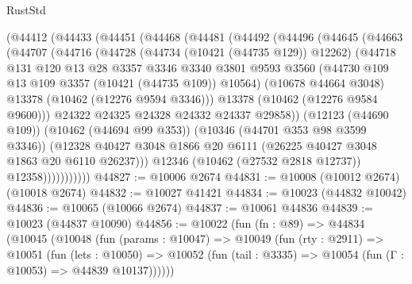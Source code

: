 \begin{lexlean}{RustStd}
\begin{coremodule}
          (@44412
            (@44433
              (@44451
                (@44468
                  (@44481
                    (@44492
                      (@44496
                        (@44645
                          (@44663
                            (@44707
                              (@44716
                                (@44728
                                  (@44734 (@10421 (@44735 @129)) @12262)
                                  (@44718
                                    @131
                                    @120
                                    @13
                                    @28
                                    @3357
                                    @3346
                                    @3340
                                    @3801
                                    @9593
                                    @3560
                                    (@44730 @109 @13 @109 @3357 (@10421 (@44735 @109)) @10564)
                                    (@10678 @44664 @3048)
                                    @13378
                                    (@10462 (@12276 @9594 @3346)))
                                  @13378
                                  (@10462 (@12276 @9584 @9600)))
                                @24322
                                @24325
                                @24328
                                @24332
                                @24337
                                @29858))
                            (@12123 (@44690 @109))
                            (@10462 (@44694 @99 @353))
                            (@10346 (@44701 @353 @98 @3599 @3346))
                            (@12328
                              @40427
                              @3048
                              @1866
                              @20
                              @6111
                              (@26225 @40427 @3048 @1863 @20 @6110 @26237)))
                          @12346
                          (@10462 (@27532 @2818 @12737))
                          @12358)))))))))))
@44827 := @10006 @2674
@44831 := @10008 (@10012 @2674) (@10018 @2674)
@44832 := @10027 @41421
@44834 := @10023 (@44832 @10042)
@44836 := @10065 (@10066 @2674)
@44837 := @10061 @44836
@44839 := @10023 (@44837 @10090)
@44856 := @10022
    (fun (fn : @89) =>
    @44834
      (@10045
        (@10048
          (fun (params : @10047) =>
          @10049
            (fun (rty : @2911) =>
            @10051
              (fun (lets : @10050) =>
              @10052 (fun (tail : @3335) => @10054 (fun (Γ : @10053) => @44839 @10137))))))

\end{coremodule}
\end{lexlean}
